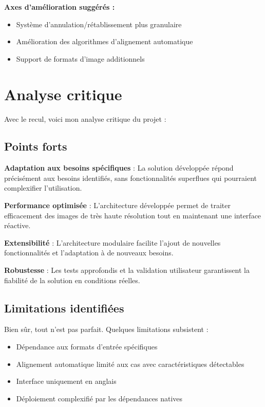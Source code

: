 \documentclass[11pt,a4paper]{report}
\begin{document}
\textbf{Axes d'amélioration suggérés :}
\begin{itemize}
\item Système d'annulation/rétablissement plus granulaire
\item Amélioration des algorithmes d'alignement automatique
\item Support de formats d'image additionnels
\end{itemize}

\section{Analyse critique}

Avec le recul, voici mon analyse critique du projet :

\subsection{Points forts}

\textbf{Adaptation aux besoins spécifiques} : La solution développée répond précisément aux besoins identifiés, sans fonctionnalités superflues qui pourraient complexifier l'utilisation.

\textbf{Performance optimisée} : L'architecture développée permet de traiter efficacement des images de très haute résolution tout en maintenant une interface réactive.

\textbf{Extensibilité} : L'architecture modulaire facilite l'ajout de nouvelles fonctionnalités et l'adaptation à de nouveaux besoins.

\textbf{Robustesse} : Les tests approfondis et la validation utilisateur garantissent la fiabilité de la solution en conditions réelles.

\subsection{Limitations identifiées}

Bien sûr, tout n'est pas parfait. Quelques limitations subsistent :

\begin{itemize}
\item Dépendance aux formats d'entrée spécifiques
\item Alignement automatique limité aux cas avec caractéristiques détectables
\item Interface uniquement en anglais
\item Déploiement complexifié par les dépendances natives
\end{itemize}
\end{document}
